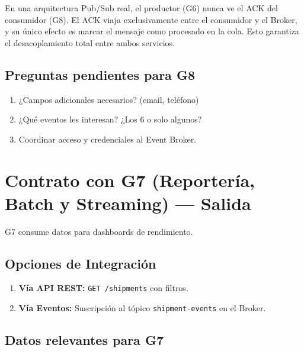 \documentclass[11pt, a4paper]{article}
\begin{document}
\begin{infobox}
  En una arquitectura Pub/Sub real, el productor (G6) nunca ve el ACK del
  consumidor (G8). El ACK viaja exclusivamente entre el consumidor y el
  Broker, y su único efecto es marcar el mensaje como procesado en la cola.
  Esto garantiza el desacoplamiento total entre ambos servicios.
\end{infobox}

\subsection{Preguntas pendientes para G8}

\begin{warningbox}[title={\faExclamationCircle\quad Confirmar con G8}]
\begin{enumerate}[noitemsep]
  \item ¿Campos adicionales necesarios? (email, teléfono)
  \item ¿Qué eventos les interesan? ¿Los 6 o solo algunos?
  \item Coordinar acceso y credenciales al Event Broker.
\end{enumerate}
\end{warningbox}


\section{Contrato con G7 (Reportería, Batch y Streaming) --- Salida}

G7 consume datos para dashboards de rendimiento.

\subsection{Opciones de Integración}

\begin{enumerate}[noitemsep]
  \item \textbf{Vía API REST:} \texttt{GET /shipments} con filtros.
  \item \textbf{Vía Eventos:} Suscripción al tópico \texttt{shipment-events} en el Broker.
\end{enumerate}

\subsection{Datos relevantes para G7}
\end{document}
